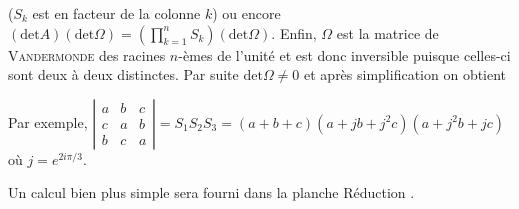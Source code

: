 {{($S_k$ est en facteur de la colonne $k$) ou encore $(\text{det}A)(\text{det}\Omega)=\left(\prod_{k=1}^{n}S_k\right)(\text{det}\Omega)$. Enfin, $\Omega$ est la matrice de \textsc{Vandermonde} des racines $n$-èmes de l'unité et est donc inversible puisque celles-ci sont deux à deux distinctes. Par suite $\text{det}\Omega\neq0$ et après simplification on obtient

\begin{center}
\end{center}

Par exemple, $\left|
\begin{array}{ccc}
a&b&c\\
c&a&b\\
b&c&a
\end{array}
\right|=S_1S_2S_3 =(a+b+c)(a+jb+j^2c)(a+j^2b+jc)$ où $j =e^{2i\pi/3}$.

Un calcul bien plus simple sera fourni dans la planche \og Réduction \fg.
}
}
